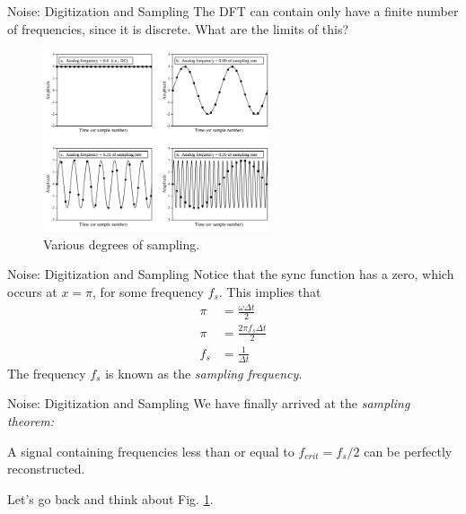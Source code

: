 \documentclass{beamer}
\begin{document}
\begin{frame}{Noise: Digitization and Sampling}
The DFT can contain only have a finite number of frequencies, since it is discrete.  What are the limits of this?
\begin{figure}
\centering
\includegraphics[width=0.6\textwidth]{figures/sampling.png}
\caption{\label{fig:sampling} Various degrees of sampling.}
\end{figure}
\end{frame}

\begin{frame}{Noise: Digitization and Sampling}
Notice that the sync function has a zero, which occurs at $x = \pi$, for some frequency $f_s$.  This implies that 
\begin{align}
\pi &= \frac{\omega \Delta t}{2} \\
\pi &= \frac{2\pi f_s \Delta t}{2} \\
f_s &= \frac{1}{\Delta t}
\end{align}
The frequency $f_s$ is known as the \textit{sampling frequency.}
\end{frame}

\begin{frame}{Noise: Digitization and Sampling}
We have finally arrived at the \textit{sampling theorem:}
\begin{tcolorbox}[colback=white,colframe=red!40!blue,title=Sampling Theorem]
\alert{A signal containing frequencies less than or equal to $f_{crit} = f_s/2$ can be perfectly reconstructed.}
\end{tcolorbox}
Let's go back and think about Fig. \ref{fig:sampling}.
\end{frame}
\end{document}
